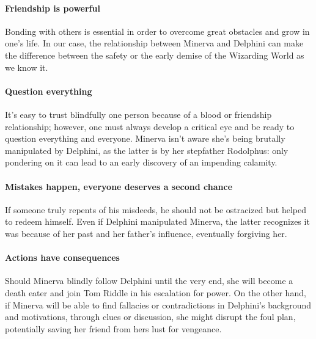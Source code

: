 \paragraph{Friendship is powerful}
Bonding with others is essential in order to overcome great obstacles and grow in one's life. In our case, the relationship between Minerva and Delphini can make the difference between the safety or the early demise of the Wizarding World as we know it.

\paragraph{Question everything}
It's easy to trust blindfully one person because of a blood or friendship relationship; however, one must always develop a critical eye and be ready to question everything and everyone. Minerva isn't aware she's being brutally manipulated by Delphini, as the latter is by her stepfather Rodolphus: only pondering on it can lead to an early discovery of an impending calamity.

\paragraph{Mistakes happen, everyone deserves a second chance}
If someone truly repents of his misdeeds, he should not be ostracized but helped to redeem himself. Even if Delphini manipulated Minerva, the latter recognizes it was because of her past and her father's influence, eventually forgiving her.

\paragraph{Actions have consequences}
Should Minerva blindly follow Delphini until the very end, she will become a death eater and join Tom Riddle in his escalation for power. On the other hand, if Minerva will be able to find fallacies or contradictions in Delphini's background and motivations, through clues or discussion, she might disrupt the foul plan, potentially saving her friend from hers lust for vengeance.
\pagebreak